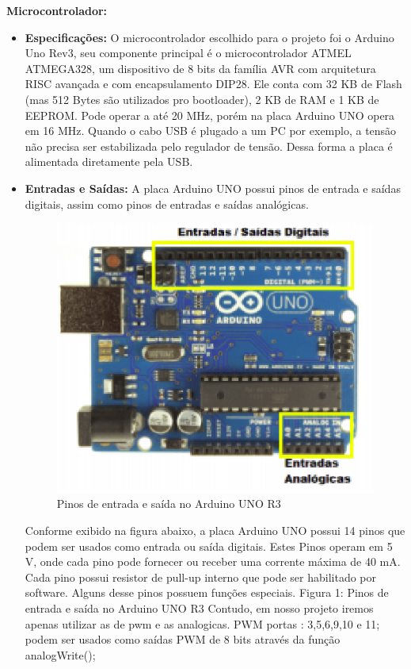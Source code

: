 \textbf{Microcontrolador:}
\begin{itemize}
    \item \textbf{Especificações:} O microcontrolador escolhido para o projeto foi o Arduino Uno Rev3, seu componente principal é o microcontrolador ATMEL ATMEGA328, um dispositivo de 8 bits da família AVR com arquitetura RISC avançada e com encapsulamento DIP28. Ele conta com 32 KB de Flash (mas 512 Bytes são utilizados pro bootloader), 2 KB de RAM e 1 KB de EEPROM. Pode operar a até 20 MHz, porém na placa Arduino UNO opera em 16 MHz. Quando o cabo USB é plugado a um PC por exemplo, a tensão não precisa ser estabilizada pelo regulador de tensão. Dessa forma a placa é alimentada diretamente pela USB.
    \item \textbf{Entradas e Saídas:} A placa Arduino UNO possui pinos de entrada e saídas digitais, assim como pinos de entradas e saídas analógicas.

    \begin{figure}[t]                  
        \centering                          
        \includegraphics[scale=0.8]{figuras/ard1.eps}
        \caption{ Pinos de entrada e saída no Arduino UNO R3 }  \label{figard1}               
    \end{figure}
    
    Conforme exibido na figura abaixo, a placa Arduino UNO possui 14 pinos que podem ser usados como entrada ou saída digitais. Estes Pinos operam em 5 V, onde cada pino pode fornecer ou receber uma corrente máxima de 40 mA. Cada pino possui resistor de pull-up interno que pode ser habilitado por software. Alguns desse pinos possuem funções especiais. Figura 1: Pinos de entrada e saída no Arduino UNO R3 Contudo, em nosso projeto iremos apenas utilizar as de pwm e as analogicas.
    PWM portas : 3,5,6,9,10 e 11; podem ser usados como saídas PWM de 8 bits através da função analogWrite();
    

\end{itemize}
